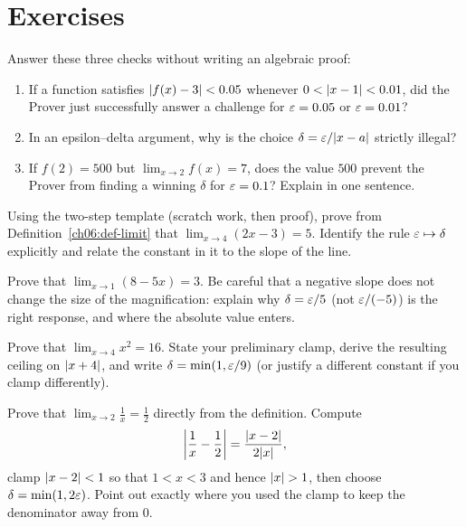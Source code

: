 \section{Exercises}
\label{ch06:exercises}

\begin{exercise}
Answer these three checks without writing an algebraic proof:
\begin{enumerate}
\item If a function satisfies $\lvert f(x)-3\rvert < 0.05$ whenever $0 < \lvert x-1\rvert < 0.01$,
  did the Prover just successfully answer a challenge for $\varepsilon=0.05$ or
  $\varepsilon=0.01$?
\item In an epsilon--delta argument, why is the choice $\delta = \varepsilon / \lvert x-a\rvert$
  strictly illegal?
\item If $f(2) = 500$ but $\lim_{x\to 2} f(x) = 7$, does the value $500$ prevent
  the Prover from finding a winning $\delta$ for $\varepsilon = 0.1$? Explain in one
  sentence.
\end{enumerate}
\end{exercise}

\begin{exercise}
Using the two-step template (scratch work, then proof), prove from
Definition~\ref{ch06:def-limit} that $\displaystyle\lim_{x\to 4}(2x-3)=5$.
Identify the rule $\varepsilon\mapsto\delta$ explicitly and relate the constant in it to
the slope of the line.
\end{exercise}

\begin{exercise}
Prove that $\displaystyle\lim_{x\to 1}(8-5x)=3$. Be careful that a negative slope
does not change the size of the magnification: explain why $\delta=\varepsilon/5$ (not
$\varepsilon/(-5)$) is the right response, and where the absolute value enters.
\end{exercise}

\begin{exercise}
Prove that $\displaystyle\lim_{x\to 4}x^2=16$. State your preliminary clamp,
derive the resulting ceiling on $\lvert x+4\rvert$, and write
$\delta=\min(1,\varepsilon/9)$ (or justify a different constant if you clamp
differently).
\end{exercise}

\begin{exercise}[A reciprocal]
Prove that $\displaystyle\lim_{x\to 2}\frac{1}{x}=\frac12$ directly from the
definition. Compute
\[
  \left\lvert \frac1x-\frac12 \right\rvert=\frac{\lvert x-2\rvert}{2\lvert x\rvert},
\]
clamp $\lvert x-2\rvert<1$ so that $1<x<3$ and hence $\lvert x\rvert>1$, then choose
$\delta=\min(1,2\varepsilon)$. Point out exactly where you used the clamp to keep the
denominator away from $0$.
\end{exercise}

